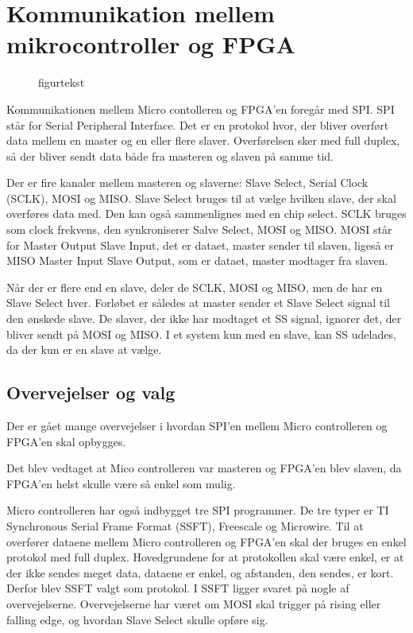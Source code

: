 \section{Kommunikation mellem mikrocontroller og FPGA}

\begin{figure}[!th]
\centering
\begin{tikzpicture}[scale=1]

\end{tikzpicture}
\caption[tekst i indholdsfortegnelsen]{figurtekst}
\label{fig:}
\end{figure}


Kommunikationen mellem Micro contolleren og FPGA’en foregår med SPI. SPI står for Serial Peripheral Interface. Det er en protokol hvor, der bliver overført data mellem en master og en eller flere slaver. Overførelsen sker med full duplex, så der bliver sendt data både fra masteren og slaven på samme tid.

Der er fire kanaler mellem masteren og slaverne: Slave Select, Serial Clock (SCLK), MOSI og MISO. Slave Select bruges til at vælge hvilken slave, der skal overføres data med. Den kan også sammenlignes med en chip select. SCLK bruges som clock frekvens, den synkroniserer Salve Select, MOSI og MISO. MOSI står for Master Output Slave Input, det er dataet, master sender til slaven, ligeså er MISO Master Input Slave Output, som er dataet, master modtager fra slaven.

Når der er flere end en slave, deler de SCLK, MOSI og MISO, men de har en Slave Select hver. Forløbet er således at master sender et Slave Select signal til den ønskede slave. De slaver, der ikke har modtaget et SS signal, ignorer det, der bliver sendt på MOSI og MISO. I et system kun med en slave, kan SS udelades, da der kun er en slave at vælge. 
 

\subsection{Overvejelser og valg}
Der er gået mange overvejelser i hvordan SPI'en mellem Micro controlleren og FPGA'en skal  opbygges.

Det blev vedtaget at Mico controlleren var masteren og FPGA'en blev slaven, da FPGA'en helst skulle være så enkel som mulig.

Micro controlleren har også indbygget tre SPI programmer. De tre typer er TI Synchronous Serial Frame Format (SSFT), Freescale og Microwire. Til at overfører dataene mellem Micro controlleren og FPGA’en skal der bruges en enkel protokol med full duplex. Hovedgrundene for at protokollen skal være enkel, er at der ikke sendes meget data, dataene er enkel, og afstanden, den sendes, er kort. Derfor blev SSFT valgt som protokol. I SSFT ligger svaret på nogle af overvejelserne. Overvejelserne har været om MOSI skal trigger på rising eller falling edge, og hvordan Slave Select skulle opføre sig.

